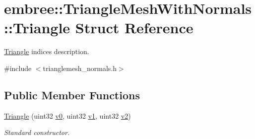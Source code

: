 \hypertarget{structembree_1_1_triangle_mesh_with_normals_1_1_triangle}{
\section{embree::TriangleMeshWithNormals::Triangle Struct Reference}
\label{structembree_1_1_triangle_mesh_with_normals_1_1_triangle}
}


\hyperlink{structembree_1_1_triangle_mesh_with_normals_1_1_triangle}{Triangle} indices description.  




{\ttfamily \#include $<$trianglemesh\_\-normals.h$>$}

\subsection*{Public Member Functions}
\begin{DoxyCompactItemize}
\item 
\hypertarget{structembree_1_1_triangle_mesh_with_normals_1_1_triangle_af6a8e65fc6e8c887d4753aba29c87766}{
\hyperlink{structembree_1_1_triangle_mesh_with_normals_1_1_triangle_af6a8e65fc6e8c887d4753aba29c87766}{Triangle} (uint32 \hyperlink{structembree_1_1_triangle_mesh_with_normals_1_1_triangle_aba597c4c5fad7329ebde8cf10f8f672c}{v0}, uint32 \hyperlink{structembree_1_1_triangle_mesh_with_normals_1_1_triangle_af13c04c7987e58b43ec840de74fd8cd1}{v1}, uint32 \hyperlink{structembree_1_1_triangle_mesh_with_normals_1_1_triangle_a6c856f634c23179a59a177508bfa0b19}{v2})}
\label{structembree_1_1_triangle_mesh_with_normals_1_1_triangle_af6a8e65fc6e8c887d4753aba29c87766}

\begin{DoxyCompactList}\small\item\em Standard constructor. \item\end{DoxyCompactList}\end{DoxyCompactItemize}
